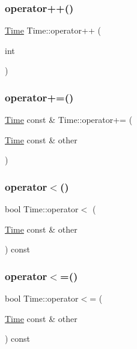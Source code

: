 \mbox{\label{classTime_a9d672dbfc01b4d7f7d5789640017dc37}} 
\subsubsection{\texorpdfstring{operator++()}{operator++()}\hspace{0.1cm}{\footnotesize\ttfamily [2/2]}}
{\footnotesize\ttfamily \hyperlink{classTime}{Time} Time\+::operator++ (\begin{DoxyParamCaption}\item[{int}]{ }\end{DoxyParamCaption})}

\mbox{\label{classTime_a54a1d73b40abf9578a5d324d2805fdce}} 
\subsubsection{\texorpdfstring{operator+=()}{operator+=()}}
{\footnotesize\ttfamily \hyperlink{classTime}{Time} const  \& Time\+::operator+= (\begin{DoxyParamCaption}\item[{\hyperlink{classTime}{Time} const \&}]{other }\end{DoxyParamCaption})}

\mbox{\label{classTime_a334738a8a0f1f8d1e6ec15d0128ad5d3}} 
\subsubsection{\texorpdfstring{operator$<$()}{operator<()}}
{\footnotesize\ttfamily bool Time\+::operator$<$ (\begin{DoxyParamCaption}\item[{\hyperlink{classTime}{Time} const \&}]{other }\end{DoxyParamCaption}) const}

\mbox{\label{classTime_a31ca86633797092eb6f997e17dd1a267}} 
\subsubsection{\texorpdfstring{operator$<$=()}{operator<=()}}
{\footnotesize\ttfamily bool Time\+::operator$<$= (\begin{DoxyParamCaption}\item[{\hyperlink{classTime}{Time} const \&}]{other }\end{DoxyParamCaption}) const}

